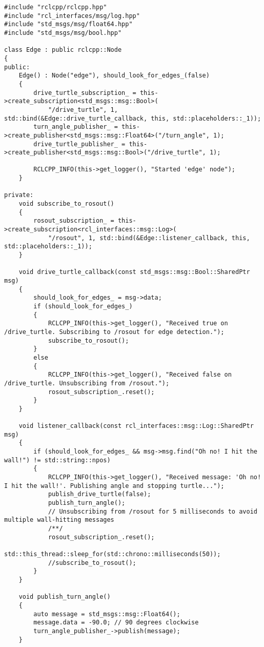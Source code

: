 \begin{lstlisting}[caption={\texttt{/edge} source code}, label={lst:edge_source_code}]
#include "rclcpp/rclcpp.hpp"
#include "rcl_interfaces/msg/log.hpp"
#include "std_msgs/msg/float64.hpp"
#include "std_msgs/msg/bool.hpp"

class Edge : public rclcpp::Node
{
public:
    Edge() : Node("edge"), should_look_for_edges_(false)
    {
        drive_turtle_subscription_ = this->create_subscription<std_msgs::msg::Bool>(
            "/drive_turtle", 1, std::bind(&Edge::drive_turtle_callback, this, std::placeholders::_1));
        turn_angle_publisher_ = this->create_publisher<std_msgs::msg::Float64>("/turn_angle", 1);
        drive_turtle_publisher_ = this->create_publisher<std_msgs::msg::Bool>("/drive_turtle", 1);

        RCLCPP_INFO(this->get_logger(), "Started 'edge' node");
    }

private:
    void subscribe_to_rosout()
    {
        rosout_subscription_ = this->create_subscription<rcl_interfaces::msg::Log>(
            "/rosout", 1, std::bind(&Edge::listener_callback, this, std::placeholders::_1));
    }

    void drive_turtle_callback(const std_msgs::msg::Bool::SharedPtr msg)
    {
        should_look_for_edges_ = msg->data;
        if (should_look_for_edges_)
        {
            RCLCPP_INFO(this->get_logger(), "Received true on /drive_turtle. Subscribing to /rosout for edge detection.");
            subscribe_to_rosout();
        }
        else
        {
            RCLCPP_INFO(this->get_logger(), "Received false on /drive_turtle. Unsubscribing from /rosout.");
            rosout_subscription_.reset();
        }
    }

    void listener_callback(const rcl_interfaces::msg::Log::SharedPtr msg)
    {
        if (should_look_for_edges_ && msg->msg.find("Oh no! I hit the wall!") != std::string::npos)
        {
            RCLCPP_INFO(this->get_logger(), "Received message: 'Oh no! I hit the wall!'. Publishing angle and stopping turtle...");
            publish_drive_turtle(false);
            publish_turn_angle();
            // Unsubscribing from /rosout for 5 milliseconds to avoid multiple wall-hitting messages
            /**/
            rosout_subscription_.reset();
            std::this_thread::sleep_for(std::chrono::milliseconds(50));
            //subscribe_to_rosout();
        }
    }

    void publish_turn_angle()
    {
        auto message = std_msgs::msg::Float64();
        message.data = -90.0; // 90 degrees clockwise
        turn_angle_publisher_->publish(message);
    }


\end{lstlisting}
